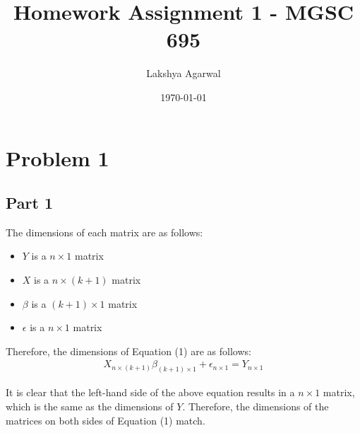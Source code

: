 \documentclass{article}[12pt]
\title{Homework Assignment 1 - MGSC 695}
\author{Lakshya Agarwal}
\date{\today}
\begin{document}
\maketitle

\section{Problem 1}
\subsection{Part 1}
The dimensions of each matrix are as follows:
\begin{itemize}
    \item $Y$ is a $n \times 1$ matrix
    \item $X$ is a $n \times (k+1)$ matrix
    \item $\beta$ is a $(k+1) \times 1$ matrix
    \item $\epsilon$ is a $n \times 1$ matrix
\end{itemize}

Therefore, the dimensions of Equation (1) are as follows:
\begin{align*}
    X_{n \times (k+1)}  \beta_{(k+1) \times 1} + \epsilon_{n \times 1} = Y_{n \times 1}
\end{align*}

It is clear that the left-hand side of the above equation results in a $n \times 1$ matrix,
which is the same as the dimensions of $Y$. Therefore, the dimensions of the matrices on both sides of
Equation (1) match.
\end{document}
